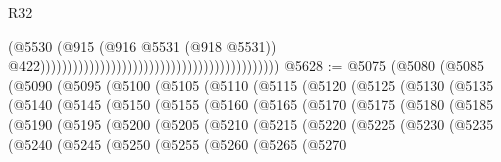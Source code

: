 \begin{lexlean}{R32}
\begin{coremodule}
                                                                                        (@5530
                                                                                          (@915
                                                                                            (@916
                                                                                              @5531
                                                                                              (@918
                                                                                                @5531))
                                                                                            @422))))))))))))))))))))))))))))))))))))))))))))
@5628 := @5075
    (@5080
      (@5085
        (@5090
          (@5095
            (@5100
              (@5105
                (@5110
                  (@5115
                    (@5120
                      (@5125
                        (@5130
                          (@5135
                            (@5140
                              (@5145
                                (@5150
                                  (@5155
                                    (@5160
                                      (@5165
                                        (@5170
                                          (@5175
                                            (@5180
                                              (@5185
                                                (@5190
                                                  (@5195
                                                    (@5200
                                                      (@5205
                                                        (@5210
                                                          (@5215
                                                            (@5220
                                                              (@5225
                                                                (@5230
                                                                  (@5235
                                                                    (@5240
                                                                      (@5245
                                                                        (@5250
                                                                          (@5255
                                                                            (@5260
                                                                              (@5265
                                                                                (@5270

\end{coremodule}
\end{lexlean}
